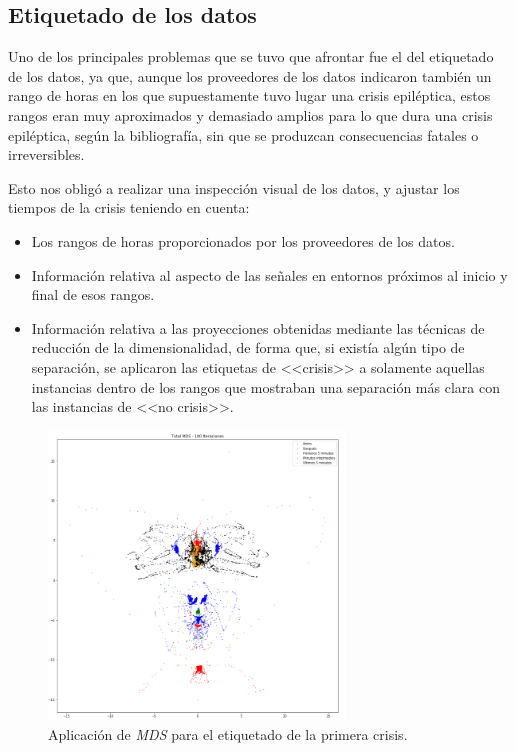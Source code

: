 \subsection{Etiquetado de los datos}

Uno de los principales problemas que se tuvo que afrontar fue el del etiquetado de los datos, ya que, aunque los proveedores de los datos indicaron también un rango de horas en los que supuestamente tuvo lugar una crisis epiléptica, estos rangos eran muy aproximados y demasiado amplios para lo que dura una crisis epiléptica, según la bibliografía, sin que se produzcan consecuencias fatales o irreversibles. 

Esto nos obligó a realizar una inspección visual de los datos, y ajustar los tiempos de la crisis teniendo en cuenta: 

\begin{itemize}
	\item Los rangos de horas proporcionados por los proveedores de los datos. 
	\item Información relativa al aspecto de las señales en entornos próximos al inicio y final de esos rangos. 
	\item Información relativa a las proyecciones obtenidas mediante las técnicas de reducción de la dimensionalidad, de forma que, si existía algún tipo de separación, se aplicaron las etiquetas de <<crisis>> a solamente aquellas instancias dentro de los rangos que mostraban una separación más clara con las instancias de <<no crisis>>. 
\end{itemize}

\begin{figure}
	\centering
	\includegraphics[width=0.7\textwidth]{../img/mdsetiquetado.png}
	\caption{Aplicación de \textit{MDS} para el etiquetado de la primera crisis.}
	\label{fig:mdsetiquetado}
\end{figure}

